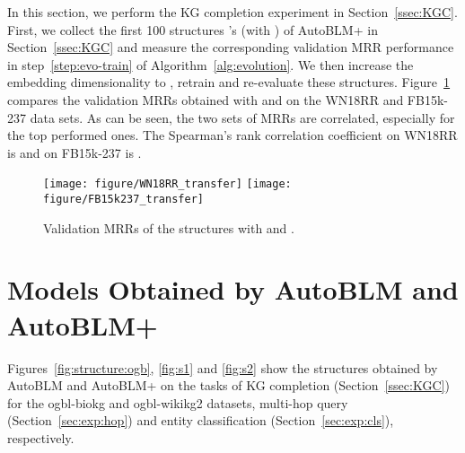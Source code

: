 \documentclass[10pt,journal,compsoc]{IEEEtran}
\begin{document}
In this section, we perform the KG completion experiment in Section~\ref{ssec:KGC}.
First, we
collect the first
100 structures 's 
(with )
of AutoBLM+ in Section~\ref{ssec:KGC}
and measure the corresponding 
validation MRR
performance 
in step~\ref{step:evo-train} of Algorithm~\ref{alg:evolution}.
We then
increase the embedding dimensionality to , 
retrain and re-evaluate these structures.
Figure~\ref{fig:transfer}
compares the validation MRRs obtained with
 and 
on the WN18RR and FB15k-237 data sets.
As can be seen,
the two sets of MRRs
are correlated,
especially for the top performed ones.
The Spearman's rank correlation coefficient
on WN18RR is
  and on FB15k-237 is .
\begin{figure}[H]
	\centering
	\texttt{[image: figure/WN18RR\_transfer]}
	\hfill
	\texttt{[image: figure/FB15k237\_transfer]}
	
	\vspace{-10px}
\caption{Validation MRRs of the structures with  and .}
	\label{fig:transfer}
\end{figure}


\section{Models Obtained by AutoBLM and AutoBLM+}
\label{app:figures}


Figures~\ref{fig:structure:ogb},
\ref{fig:s1} and
\ref{fig:s2} 
show the structures obtained by AutoBLM and AutoBLM+
on the tasks of 
KG completion (Section~\ref{ssec:KGC}) for the  ogbl-biokg and ogbl-wikikg2
datasets, 
multi-hop query (Section~\ref{sec:exp:hop}) and
entity classification (Section~\ref{sec:exp:cls}), respectively.
\end{document}
